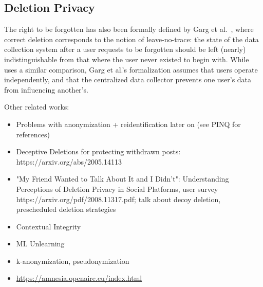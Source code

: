 

\subsection{Deletion Privacy}
The right to be forgotten has also been formally defined by Garg et
al.~\cite{garg}, where correct deletion corresponds to the notion of
leave-no-trace: the state of the data collection system after a user requests to be forgotten should
be left (nearly) indistinguishable from that where the user never existed to begin with. While
\sys{} uses a similar comparison, Garg et al.'s formalization assumes that users operate
independently, and that the centralized data collector prevents one user's data from influencing
another's.

Other related works:
\begin{itemize}
    \item Problems with anonymization + reidentification later on (see PINQ for references)
    \item Deceptive Deletions for protecting withdrawn posts: https://arxiv.org/abs/2005.14113
    \item "My Friend Wanted to Talk About It and I Didn't": Understanding Perceptions of
        Deletion Privacy in Social Platforms, user survey https://arxiv.org/pdf/2008.11317.pdf;
        talk about decoy deletion, prescheduled deletion strategies~\cite{myfw}
    \item Contextual Integrity
    \item ML Unlearning
    \item k-anonymization, pseudonymization
    \item \url{https://amnesia.openaire.eu/index.html}
\end{itemize}
